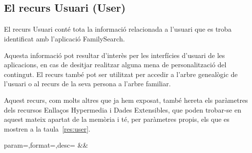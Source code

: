 \subsection{El recurs Usuari (User)}\label{sec:user}

    \paragraph{}
    El recurs Usuari conté tota la informació relacionada a l'usuari que es troba identificat amb l'aplicació FamilySearch.

    Aquesta informació pot resultar d'interès per les interfícies d'usuari de les aplicacions, en cas de desitjar realitzar alguna mena de personalització del contingut. El recurs també pot ser utilitzat per accedir a l'arbre genealògic de l'usuari o al recurs de la seva persona a l'arbre familiar.

     Aquest recurs, com molts altres que ja hem exposat, també hereta els paràmetres dels recursos Enllaços Hypermedia i Dades Extensibles, que poden trobar-se en aquest mateix apartat de la memòria i té, per paràmetres propis, els que es mostren a la taula~\ref{res:user}.

     \begin{center}
              {param=\param,format=\format,desc=\desc}
              {\param&\format&\desc}
      \end{center}
